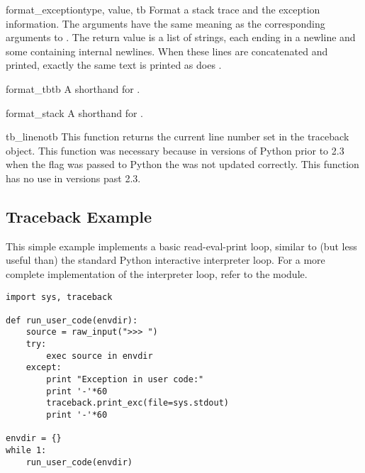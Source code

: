 \begin{funcdesc}{format_exception}{type, value, tb}
Format a stack trace and the exception information.  The arguments 
have the same meaning as the corresponding arguments to
.  The return value is a list of strings,
each ending in a newline and some containing internal newlines.  When
these lines are concatenated and printed, exactly the same text is
printed as does .
\end{funcdesc}

\begin{funcdesc}{format_tb}{tb}
A shorthand for .
\end{funcdesc}

\begin{funcdesc}{format_stack}{}
A shorthand for .
\end{funcdesc}

\begin{funcdesc}{tb_lineno}{tb}
This function returns the current line number set in the traceback
object.  This function was necessary because in versions of Python
prior to 2.3 when the  flag was passed to Python the
 was not updated correctly.  This function
has no use in versions past 2.3.
\end{funcdesc}


\subsection{Traceback Example \label{traceback-example}}

This simple example implements a basic read-eval-print loop, similar
to (but less useful than) the standard Python interactive interpreter
loop.  For a more complete implementation of the interpreter loop,
refer to the  module.

\begin{verbatim}
import sys, traceback

def run_user_code(envdir):
    source = raw_input(">>> ")
    try:
        exec source in envdir
    except:
        print "Exception in user code:"
        print '-'*60
        traceback.print_exc(file=sys.stdout)
        print '-'*60

envdir = {}
while 1:
    run_user_code(envdir)
\end{verbatim}
